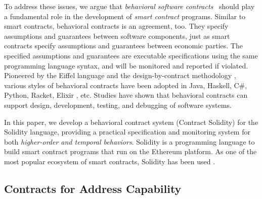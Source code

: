 To address these issues, we argue that \emph{behavioral software
contracts}~\cite{DBLP:conf/tools/Meyer98a} should play a fundamental role in
the development of \emph{smart contract} programs.
Similar to smart contracts, behavioral contracts is an agreement, too. They
specify assumptions and guarantees between software components, just as
smart contracts specify assumptions and guarantees between economic parties.
The specified assumptions and guarantees are executable specifications
using the same programming language syntax, and will be monitored and reported
if violated.
Pioneered by the Eiffel language \cite{DBLP:books/ph/Meyer91} and the
design-by-contract methodology \cite{DBLP:conf/tools/Meyer98a,
DBLP:books/ph/Meyer97}, various styles of behavioral contracts have been
adopted in Java, Haskell, C\#, Python, Racket, Elixir
\cite{DBLP:conf/erlang/0001BBHMEF22}, etc. 
Studies \cite{DBLP:conf/rodin/Chalin06, DBLP:books/ph/Meyer97}
have shown that behavioral contracts can support design, development,
testing, and debugging of software systems.

In this paper, we develop a behavioral contract system \lang (Contract
Solidity) for the Solidity language, providing a practical specification and
monitoring system for both \emph{higher-order and temporal behaviors}.
Solidity is a programming language to build smart contract programs that run on
the Ethereum platform.  As one of the most popular ecosystem of smart
contracts, Solidity has been used .



\subsection*{\textbf{Contracts for Address Capability}}


